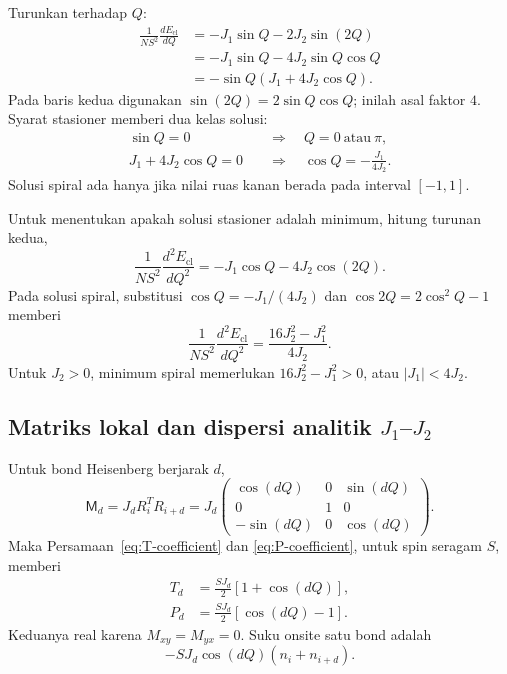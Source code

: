\documentclass[11pt,a4paper]{article}
\newcommand{\mM}{\mathsf M}
\begin{document}
Turunkan terhadap $Q$:
\begin{align}
\frac1{NS^2}\frac{dE_{\mathrm{cl}}}{dQ}
&=-J_1\sin Q-2J_2\sin(2Q)\\
&=-J_1\sin Q-4J_2\sin Q\cos Q\\
&=-\sin Q(J_1+4J_2\cos Q).
\end{align}
Pada baris kedua digunakan $\sin(2Q)=2\sin Q\cos Q$; inilah asal faktor $4$. Syarat stasioner memberi dua kelas solusi:
\begin{align}
\sin Q=0&\quad\Rightarrow\quad Q=0\ \text{atau}\ \pi,\\
J_1+4J_2\cos Q=0&\quad\Rightarrow\quad
\boxed{\cos Q=-\frac{J_1}{4J_2}.}
\label{eq:j1j2-pitch}
\end{align}
Solusi spiral ada hanya jika nilai ruas kanan berada pada interval $[-1,1]$.

Untuk menentukan apakah solusi stasioner adalah minimum, hitung turunan kedua,
\begin{equation}
\frac1{NS^2}\frac{d^2E_{\mathrm{cl}}}{dQ^2}
=-J_1\cos Q-4J_2\cos(2Q).
\end{equation}
Pada solusi spiral, substitusi $\cos Q=-J_1/(4J_2)$ dan $\cos2Q=2\cos^2Q-1$ memberi
\begin{equation}
\frac1{NS^2}\frac{d^2E_{\mathrm{cl}}}{dQ^2}
=\frac{16J_2^2-J_1^2}{4J_2}.
\label{eq:j1j2-stability}
\end{equation}
Untuk $J_2>0$, minimum spiral memerlukan $16J_2^2-J_1^2>0$, atau $|J_1|<4J_2$.

\subsection{Matriks lokal dan dispersi analitik \texorpdfstring{$J_1$--$J_2$}{J1--J2}}

Untuk bond Heisenberg berjarak $d$,
\begin{equation}
\mM_d=J_dR_i^TR_{i+d}
=J_d
\begin{pmatrix}
\cos(dQ)&0&\sin(dQ)\\
0&1&0\\
-\sin(dQ)&0&\cos(dQ)
\end{pmatrix}.
\label{eq:heisenberg-local-matrix}
\end{equation}
Maka Persamaan~\eqref{eq:T-coefficient} dan \eqref{eq:P-coefficient}, untuk spin seragam $S$, memberi
\begin{align}
T_d&=\frac{SJ_d}{2}[1+\cos(dQ)],\\
P_d&=\frac{SJ_d}{2}[\cos(dQ)-1].
\end{align}
Keduanya real karena $M_{xy}=M_{yx}=0$. Suku onsite satu bond adalah
\begin{equation}
-SJ_d\cos(dQ)(n_i+n_{i+d}).
\end{equation}
\end{document}
